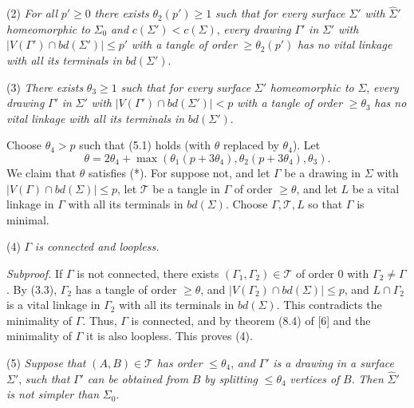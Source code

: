 \hspace*{12pt}(2) \textit{For all} $p' \ge 0$ \textit{there exists} $\theta_2(p') \ge 1$ \textit{such that for every surface} $\Sigma'$ \textit{with} $\hat{\Sigma}'$ \textit{homeomorphic to} $\Sigma_0$ \textit{and} $c(\Sigma') < c(\Sigma)$, \textit{every drawing} $\Gamma'$ \textit{in} $\Sigma'$ \textit{with} $|V(\Gamma') \cap bd(\Sigma')| \le p'$ \textit{with a tangle of order} $\ge \theta_2(p')$ \textit{has no vital linkage with all its terminals in} $bd(\Sigma')$.

\hspace*{12pt}(3) \textit{There exists} $\theta_3 \ge 1$ \textit{such that for every surface} $\Sigma'$ \textit{homeomorphic to} $\Sigma$, \textit{every drawing} $\Gamma'$ \textit{in} $\Sigma'$ \textit{with} $|V(\Gamma') \cap bd(\Sigma')| < p$ \textit{with a tangle of order} $\ge \theta_3$ \textit{has no vital linkage with all its terminals in} $bd(\Sigma')$.

Choose $\theta_4 > p$ such that (5.1) holds (with $\theta$ replaced by $\theta_4$). Let
\begin{equation*}
\theta = 2\theta_4 + \max(\theta_1(p + 3\theta_4), \theta_2(p + 3\theta_4), \theta_3).
\end{equation*}
We claim that $\theta$ satisfies (*). For suppose not, and let $\Gamma$ be a drawing in $\Sigma$ with $|V(\Gamma) \cap bd(\Sigma)| \le p$, let $\mathcal{T}$ be a tangle in $\Gamma$ of order $\ge \theta$, and let $L$ be a vital linkage in $\Gamma$ with all its terminals in $bd(\Sigma)$. Choose $\Gamma, \mathcal{T}, L$ so that $\Gamma$ is minimal.

\hspace*{12pt}(4) $\Gamma$ \textit{is connected and loopless.}

\textit{Subproof.} If $\Gamma$ is not connected, there exists $(\Gamma_1, \Gamma_2) \in \mathcal{T}$ of order 0 with $\Gamma_2 \ne \Gamma$. By (3.3), $\Gamma_2$ has a tangle of order $\ge \theta$, and $|V(\Gamma_2) \cap bd(\Sigma)| \le p$, and $L \cap \Gamma_2$ is a vital linkage in $\Gamma_2$ with all its terminals in $bd(\Sigma)$. This contradicts the minimality of $\Gamma$. Thus, $\Gamma$ is connected, and by theorem (8.4) of [6] and the minimality of $\Gamma$ it is also loopless. This proves (4).

\hspace*{12pt}(5) \textit{Suppose that} $(A, B) \in \mathcal{T}$ \textit{has order} $\le \theta_4$, \textit{and} $\Gamma'$ \textit{is a drawing in a surface} $\Sigma'$, \textit{such that} $\Gamma'$ \textit{can be obtained from} $B$ \textit{by splitting} $\le \theta_4$ \textit{vertices of} $B$. \textit{Then} $\hat{\Sigma}'$ \textit{is not simpler than} $\Sigma_0$.


